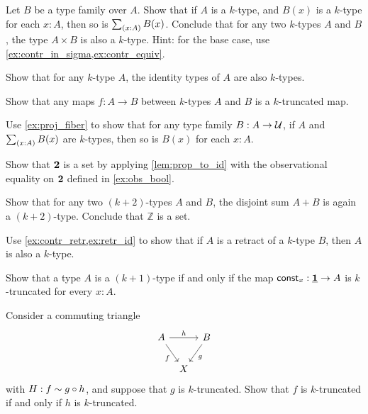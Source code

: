 \begin{exercises}
\begin{subexenum}
\item Let $B$ be a type family over $A$. Show that if $A$ is a $k$-type, and $B(x)$ is a $k$-type for each $x:A$, then so is $\sm{x:A}B(x)$. Conclude that for any two $k$-types $A$ and $B$, the type $A\times B$ is also a $k$-type. Hint: for the base case, use \cref{ex:contr_in_sigma,ex:contr_equiv}.
\item Show that for any $k$-type $A$, the identity types of $A$ are also $k$-types.
\item Show that any maps $f:A\to B$ between $k$-types $A$ and $B$
is a $k$-truncated map.
\item Use \cref{ex:proj_fiber} to show that for any type family $B:A\to \mathcal{U}$, if $A$ and $\sm{x:A}B(x)$ are $k$-types, then so is $B(x)$ for each $x:A$. 
\end{subexenum}
\item \label{ex:eq_bool}Show that $\mathbf{2}$ is a set by applying \cref{lem:prop_to_id} with the observational equality on $\mathbf{2}$ defined in \cref{ex:obs_bool}.
\item \label{ex:set_coprod}Show that for any two $(k+2)$-types $A$ and $B$, the disjoint sum $A+B$ is again a $(k+2)$-type. Conclude that $\mathbb{Z}$ is a set.
\item Use \cref{ex:contr_retr,ex:retr_id} to show that if $A$ is a retract of a $k$-type $B$, then $A$ is also a $k$-type.
\item Show that a type $A$ is a $(k+1)$-type if and only if the map $\mathsf{const}_x:\underline{\mathbf{1}}\to A$ is $k$-truncated for every $x:A$.
\item Consider a commuting triangle
\begin{equation*}
\begin{tikzcd}[column sep=tiny]
A \arrow[rr,"h"] \arrow[dr,swap,"f"] & & B \arrow[dl,"g"] \\
& X
\end{tikzcd}
\end{equation*}
with $H: f \sim g \circ h$, and suppose that $g$ is $k$-truncated. Show that $f$ is $k$-truncated if and only if $h$ is $k$-truncated.
\end{exercises}
